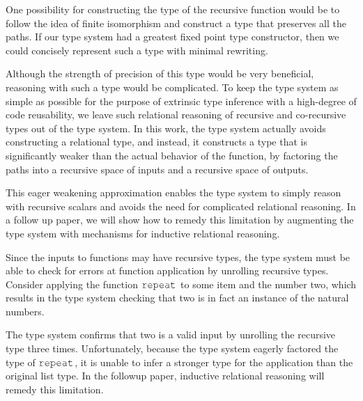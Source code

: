 \documentclass[acmsmall]{acmart}
\theoremstyle{definition}
\begin{document}
\noindent
One possibility for constructing the type of the recursive function would
be to follow the idea of finite isomorphism and construct a type 
that preserves all the paths. If our type system had a greatest fixed point
type constructor, then we could concisely represent such a type with minimal
rewriting.


\noindent
Although the strength of precision of this type would be very beneficial,
reasoning with such a type would be complicated. To keep the type system as
simple as possible for the purpose of extrinsic type inference with a high-degree
of code reusability, we leave such relational reasoning of recursive and co-recursive types out of
the type system. 
In this work, the type system actually avoids constructing a relational type, and instead, it
constructs a type that is significantly weaker than the actual behavior of the function,
by factoring the paths into a recursive space of inputs and a recursive space of outputs. 


\noindent
This eager weakening approximation enables the type system
to simply reason with recursive scalars and avoids the need for complicated
relational reasoning. In a follow up paper,
we will show how to remedy this limitation by augmenting the type system with
mechanisms for inductive relational reasoning.

Since the inputs to functions may have recursive types, the type 
system must be able to check for errors at function application by unrolling
recursive types.
Consider applying the function $\J{repeat}$ to some item and the number two, 
which results in the type system checking that two is in fact an instance of the natural numbers.


\noindent
The type system confirms that two is a valid input by unrolling the recursive type three times.
Unfortunately, because the type system eagerly factored the type of $\J{repeat}$, it
is unable to infer a stronger type for the application than the original list type. 
In the followup paper, inductive relational reasoning will remedy this limitation.
\end{document}
